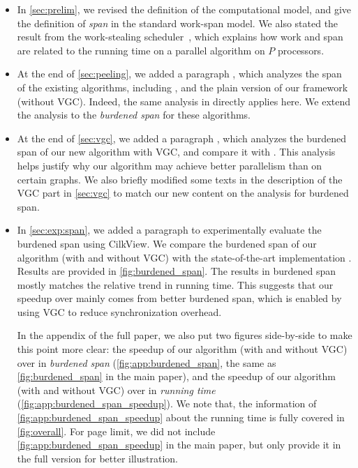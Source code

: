 \begin{itemize}
  \item In \cref{sec:prelim}, we revised the definition of the computational model, and give the definition of \emph{span} in the standard work-span model. We also stated the result from the work-stealing scheduler~\cite{arora2001thread, BL98}, which explains how work and span are related to the running time on a parallel algorithm on $P$ processors. 
  \item At the end of \cref{sec:peeling}, we added a paragraph , which analyzes the span of the existing algorithms, including \Julienne{}, and the plain version of our framework (without VGC). Indeed, the same analysis in \Julienne{} directly applies here.  We extend the analysis to the \emph{burdened span} for these algorithms. 
  \item At the end of \cref{sec:vgc}, we added a paragraph , which analyzes the burdened span of our new algorithm with VGC, and compare it with \Julienne{}. This analysis helps justify why our algorithm may achieve better parallelism than \Julienne{} on certain graphs. We also briefly modified some texts in the description of the VGC part in \cref{sec:vgc} to match our new content on the analysis for burdened span. 
  \item In \cref{sec:exp:span}, we added a paragraph to experimentally evaluate the burdened span using CilkView. We compare the burdened span of our algorithm (with and without VGC) with the state-of-the-art implementation \Julienne{}. Results are provided in \cref{fig:burdened_span}. 
      The results in burdened span mostly matches the relative trend in running time. This suggests that our speedup over \Julienne{} mainly comes from better burdened span, which is enabled by using VGC to reduce synchronization overhead. 
      
      In the appendix of the full paper, we also put two figures side-by-side to make this point more clear: the speedup of our algorithm (with and without VGC) over \Julienne{} in \emph{burdened span} (\cref{fig:app:burdened_span}, the same as \cref{fig:burdened_span} in the main paper), and the speedup of our algorithm (with and without VGC) over \Julienne{} in \emph{running time} (\cref{fig:app:burdened_span_speedup}). 
      We note that, the information of \cref{fig:app:burdened_span_speedup} about the running time is fully covered in \cref{fig:overall}. 
      For page limit, we did not include \cref{fig:app:burdened_span_speedup} in the main paper, but only provide it in the full version for better illustration. 
\end{itemize}
